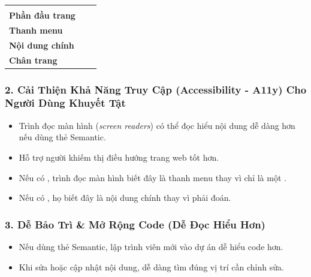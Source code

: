\begin{prettyTableBox}
\begin{tabularx}{\linewidth}{>{\sffamily\bfseries\color{primaryBlue}}C{3.0cm} Z Z}
 &  &  \\
Phần đầu trang &  &  \\
Thanh menu &  &  \\
Nội dung chính &  &  \\
Chân trang &  &  \\
\end{tabularx}
\end{prettyTableBox}

\subsubsection{2. Cải Thiện Khả Năng Truy Cập (Accessibility - A11y) Cho Người Dùng Khuyết Tật}
\begin{itemize}[leftmargin=1.8em, itemsep=3pt, parsep=0pt]
    \item Trình đọc màn hình (\textit{screen readers}) có thể đọc hiểu nội dung dễ dàng hơn nếu dùng thẻ Semantic.
    \item Hỗ trợ người khiếm thị điều hướng trang web tốt hơn.
\end{itemize}

\begin{noteBox}
\begin{itemize}[leftmargin=1.5em, itemsep=2pt, parsep=0pt]
    \item Nếu có , trình đọc màn hình biết đây là thanh menu thay vì chỉ là một .
    \item Nếu có , họ biết đây là nội dung chính thay vì phải đoán.
\end{itemize}
\end{noteBox}

\subsubsection{3. Dễ Bảo Trì \& Mở Rộng Code (Dễ Đọc Hiểu Hơn)}
\begin{itemize}[leftmargin=1.8em, itemsep=3pt, parsep=0pt]
    \item Nếu dùng thẻ Semantic, lập trình viên mới vào dự án dễ hiểu code hơn.
    \item Khi sửa hoặc cập nhật nội dung, dễ dàng tìm đúng vị trí cần chỉnh sửa.
\end{itemize}

